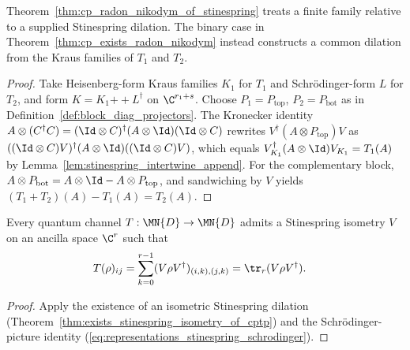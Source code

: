 \begin{remark}
    \label{rem:cp_radon_nikodym_scope}
    Theorem~\ref{thm:cp_radon_nikodym_of_stinespring} treats a finite family
    relative to a supplied Stinespring dilation. The binary case in
    Theorem~\ref{thm:cp_exists_radon_nikodym} instead constructs a common
    dilation from the Kraus families of $T_1$ and $T_2$.
\end{remark}

\begin{proof}\leanok
    Take Heisenberg-form Kraus families $K_1$ for $T_1$ and
    Schr\"odinger-form $L$ for $T_2$, and form
    $K=K_1\mathbin{+\!+}L^\dagger$ on $\C^{r_1+s}$. Choose
    $P_1=P_{\mathrm{top}}$, $P_2=P_{\mathrm{bot}}$ as in
    Definition~\ref{def:block_diag_projectors}. The Kronecker identity
    $A\otimes(C^\dagger C)
    =(\Id\otimes C)^\dagger(A\otimes\Id)(\Id\otimes C)$ rewrites
    $V^\dagger(A\otimes P_{\mathrm{top}})V$ as
    $((\Id\otimes C)V)^\dagger(A\otimes\Id)((\Id\otimes C)V)$,
    which equals $V_{K_1}^\dagger(A\otimes\Id)V_{K_1}=T_1(A)$ by
    Lemma~\ref{lem:stinespring_intertwine_append}. For the complementary
    block, $A\otimes P_{\mathrm{bot}}
    =A\otimes\Id-A\otimes P_{\mathrm{top}}$, and sandwiching by $V$ yields
    $(T_1+T_2)(A)-T_1(A)=T_2(A)$.
\end{proof}

\begin{theorem}
    \label{thm:channel_exists_stinespring_open_system}
    \leanok
    Every quantum channel $T:\MN{D}\to\MN{D}$ admits a Stinespring
    isometry $V$ on an ancilla space $\C^r$ such that
    \begin{align}
        T(\rho)_{ij}
        &=\sum_{k=0}^{r-1}(V\rho V^\dagger)_{(i,k),(j,k)}
          =\tr_r(V\rho V^\dagger).
        \label{eq:representations_open_system}
    \end{align}
\end{theorem}

\begin{proof}\leanok
    Apply the existence of an isometric Stinespring dilation
    (Theorem~\ref{thm:exists_stinespring_isometry_of_cptp}) and the
    Schr\"odinger-picture identity
    (\ref{eq:representations_stinespring_schrodinger}).
\end{proof}

